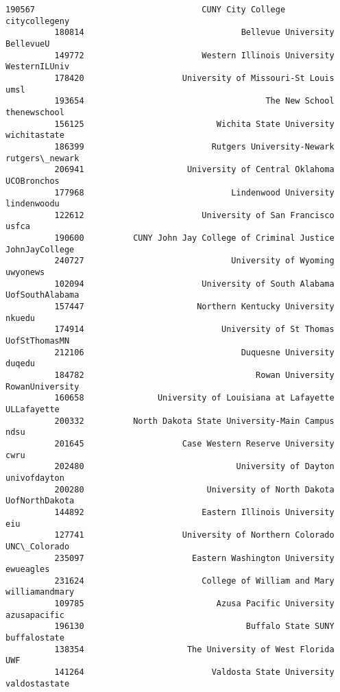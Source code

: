 \documentclass[11pt]{article}
\begin{document}
\begin{Verbatim}[commandchars=\\\{\}]
          190567                                  CUNY City College    citycollegeny   
          180814                                Bellevue University        BellevueU   
          149772                        Western Illinois University    WesternILUniv   
          178420                    University of Missouri-St Louis             umsl   
          193654                                     The New School     thenewschool   
          156125                           Wichita State University     wichitastate   
          186399                          Rutgers University-Newark   rutgers\_newark   
          206941                     University of Central Oklahoma      UCOBronchos   
          177968                              Lindenwood University      lindenwoodu   
          122612                        University of San Francisco            usfca   
          190600          CUNY John Jay College of Criminal Justice   JohnJayCollege   
          240727                              University of Wyoming         uwyonews   
          102094                        University of South Alabama  UofSouthAlabama   
          157447                       Northern Kentucky University           nkuedu   
          174914                            University of St Thomas    UofStThomasMN   
          212106                                Duquesne University           duqedu   
          184782                                   Rowan University  RowanUniversity   
          160658               University of Louisiana at Lafayette      ULLafayette   
          200332          North Dakota State University-Main Campus             ndsu   
          201645                    Case Western Reserve University             cwru   
          202480                               University of Dayton     univofdayton   
          200280                         University of North Dakota   UofNorthDakota   
          144892                        Eastern Illinois University              eiu   
          127741                    University of Northern Colorado     UNC\_Colorado   
          235097                      Eastern Washington University        ewueagles   
          231624                        College of William and Mary   williamandmary   
          109785                           Azusa Pacific University     azusapacific   
          196130                                 Buffalo State SUNY     buffalostate   
          138354                     The University of West Florida              UWF   
          141264                          Valdosta State University    valdostastate   

\end{Verbatim}
\end{document}
